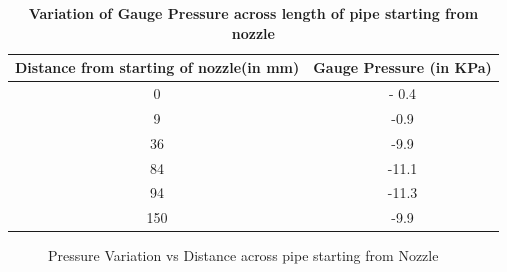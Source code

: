 \documentclass[12pt,a4paper]{article}
\begin{document}
\begin{table}[ht]
 \centering
 \caption{\textbf{Variation of Gauge Pressure across length of pipe starting from nozzle}}
\vspace{2mm}
\begin{tabular}{ |c|c| } 
 \hline
 \textbf{Distance from starting of nozzle(in mm)} & \textbf{Gauge Pressure (in KPa)}  \\ 
 \hline
  0 & - 0.4 \\ 
 \hline
  9 & -0.9 \\ 
 \hline
 36 & -9.9 \\ 
 \hline
 84 & -11.1 \\
  \hline
 94 & -11.3 \\ 
 \hline 
 150 & -9.9 \\
 \hline
\end{tabular}
\end{table}
\begin{figure}[!ht]
	\begin{center}
	\end{center}
	\caption{Pressure Variation vs Distance across pipe starting from Nozzle }
\end{figure}
\newpage
\end{document}
